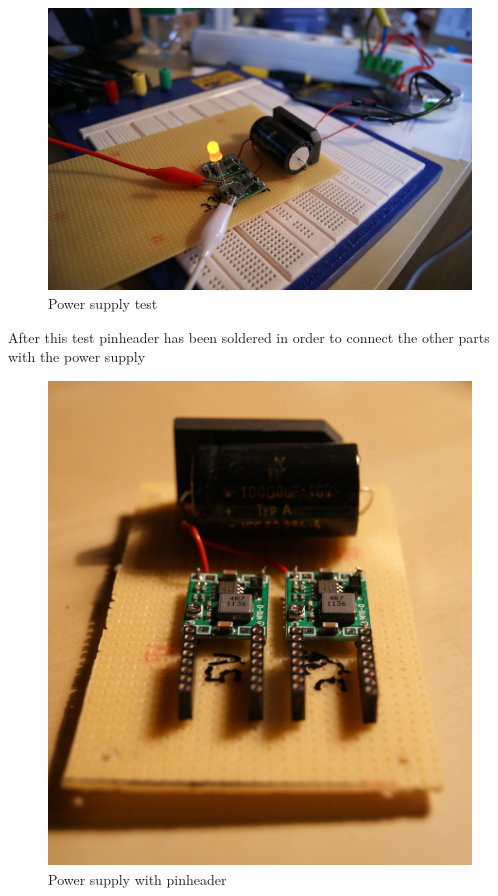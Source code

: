\begin{figure}[h!]
	\begin{center}
	\includegraphics[scale=0.4]{pictures/powerSupplyTest}
	\caption{Power supply test}	
	\end{center}
\end{figure}

After this test pinheader has been soldered in order to connect the other parts with the power supply

\begin{figure}[h!]
	\begin{center}
	\includegraphics[scale=0.4]{pictures/powerSupplyPinheader}
	\caption{Power supply with pinheader}
	\end{center}
\end{figure}


